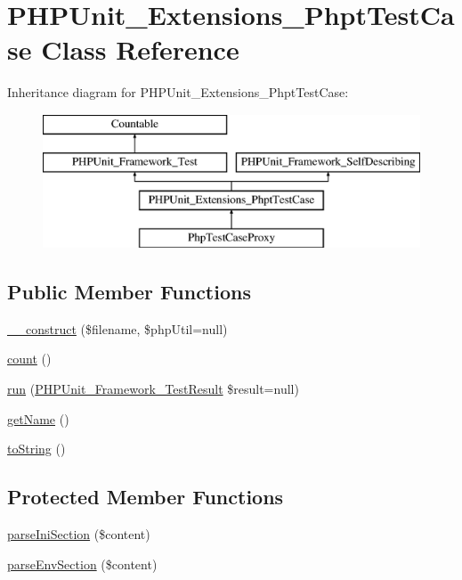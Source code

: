 \hypertarget{class_p_h_p_unit___extensions___phpt_test_case}{}\section{P\+H\+P\+Unit\+\_\+\+Extensions\+\_\+\+Phpt\+Test\+Case Class Reference}
\label{class_p_h_p_unit___extensions___phpt_test_case}
Inheritance diagram for P\+H\+P\+Unit\+\_\+\+Extensions\+\_\+\+Phpt\+Test\+Case\+:\begin{figure}[H]
\begin{center}
\leavevmode
\includegraphics[height=4.000000cm]{class_p_h_p_unit___extensions___phpt_test_case}
\end{center}
\end{figure}
\subsection*{Public Member Functions}
\begin{DoxyCompactItemize}
\item 
\mbox{\hyperlink{class_p_h_p_unit___extensions___phpt_test_case_aa1f8d64ed3524f00ad87c3776060c456}{\+\_\+\+\_\+construct}} (\$filename, \$php\+Util=null)
\item 
\mbox{\hyperlink{class_p_h_p_unit___extensions___phpt_test_case_ac751e87b3d4c4bf2feb03bee8b092755}{count}} ()
\item 
\mbox{\hyperlink{class_p_h_p_unit___extensions___phpt_test_case_aba2e5a83092b40735a7a61c572cd6256}{run}} (\mbox{\hyperlink{class_p_h_p_unit___framework___test_result}{P\+H\+P\+Unit\+\_\+\+Framework\+\_\+\+Test\+Result}} \$result=null)
\item 
\mbox{\hyperlink{class_p_h_p_unit___extensions___phpt_test_case_a3d0963e68bb313b163a73f2803c64600}{get\+Name}} ()
\item 
\mbox{\hyperlink{class_p_h_p_unit___extensions___phpt_test_case_a5558c5d549f41597377fa1ea8a1cefa3}{to\+String}} ()
\end{DoxyCompactItemize}
\subsection*{Protected Member Functions}
\begin{DoxyCompactItemize}
\item 
\mbox{\hyperlink{class_p_h_p_unit___extensions___phpt_test_case_ad069d30738c82a20b6241c92e4dfa747}{parse\+Ini\+Section}} (\$content)
\item 
\mbox{\hyperlink{class_p_h_p_unit___extensions___phpt_test_case_a54fbac54a98251a8c37db93e67c4277f}{parse\+Env\+Section}} (\$content)
\end{DoxyCompactItemize}


